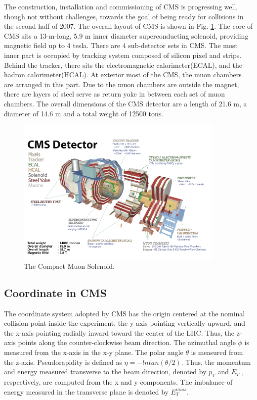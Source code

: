 The construction, installation and commissioning of CMS is progressing well, though not
without challenges, towards the goal of being ready for collisions in the second half of 2007.
The overall layout of CMS is shown in Fig. \ref{fig:CMS}. The core of CMS sits a 13-m-long, 5.9 m
inner diameter superconducting solenoid, providing magnetic field up to 4 tesla. There are 4 sub-detector sets in CMS. The most inner part is occupied by tracking system composed of silicon pixel and strips. Behind the tracker, there sits the electromagnetic calorimeter(ECAL), and the hadron calorimeter(HCAL). At exterior most of the CMS, the muon chambers are arranged in this part. Due to the muon chambers are outside the magnet, there are layers of steel serve as return yoke in between each set of muon chambers. The overall dimensions of the CMS detector are a length of 21.6 m, a diameter of 14.6 m and a total weight of 12500 tons.

\begin{figure}
 \begin{center}
  \includegraphics[width=0.9\textwidth]{plot/cms_3d_jul10.png}
 \end{center}
\caption{\label{fig:CMS}The Compact Muon Solenoid.}
\end{figure}

\subsection{Coordinate in CMS}
The coordinate system adopted by CMS has the origin centered at the nominal collision point
inside the experiment, the y-axis pointing vertically upward, and the x-axis pointing radially inward toward the center of the LHC. Thus, the z-axis points along the counter-clockwise beam direction. The azimuthal angle $\phi$ is measured from the x-axis in the x-y plane. The polar angle $\theta$ is measured from the z-axis. Pseudorapidity is
defined as $\eta = -ln tan(\theta /2)$. Thus, the momentum and energy measured transverse to the
beam direction, denoted by $p_{T}$ and $E_{T}$ , respectively, are computed from the x and y components. The imbalance of energy measured in the transverse plane is denoted by $E_{T}^{miss}$.


